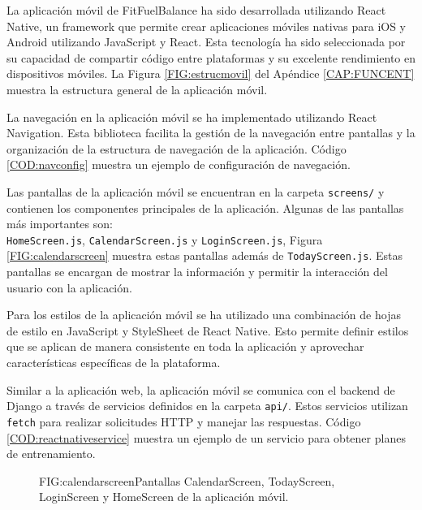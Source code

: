 La aplicación móvil  de FitFuelBalance ha sido desarrollada utilizando React Native, un framework que permite crear aplicaciones móviles nativas para iOS y Android utilizando JavaScript y React. Esta tecnología ha sido seleccionada por su capacidad de compartir código entre plataformas y su excelente rendimiento en dispositivos móviles. La Figura \ref{FIG:estrucmovil} del Apéndice \ref{CAP:FUNCENT} muestra la estructura general de la aplicación móvil.

La navegación  en la aplicación móvil se ha implementado utilizando React Navigation. Esta biblioteca facilita la gestión de la navegación entre pantallas y la organización de la estructura de navegación de la aplicación. Código \ref{COD:navconfig} muestra un ejemplo de configuración de navegación.

Las pantallas de la aplicación móvil se encuentran en la carpeta \texttt{screens/}  y contienen los componentes principales de la aplicación. Algunas de las pantallas más importantes son: \\\texttt{HomeScreen.js}, \texttt{CalendarScreen.js} y \texttt{LoginScreen.js}, Figura \ref{FIG:calendarscreen} muestra estas pantallas además de \texttt{TodayScreen.js}. Estas pantallas se encargan de mostrar la información y permitir la interacción del usuario con la aplicación.

Para los estilos  de la aplicación móvil se ha utilizado una combinación de hojas de estilo en JavaScript y StyleSheet de React Native. Esto permite definir estilos que se aplican de manera consistente en toda la aplicación y aprovechar características específicas de la plataforma.

Similar a la aplicación web, la aplicación móvil se comunica con el backend de Django a través de servicios definidos en la carpeta \texttt{api/}. Estos servicios utilizan \texttt{fetch}  para realizar solicitudes HTTP y manejar las respuestas. Código \ref{COD:reactnativeservice} muestra un ejemplo de un servicio para obtener planes de entrenamiento.

\begin{figure}[CalendarScreen, TodayScreen, LoginScreen y HomeScreen]{FIG:calendarscreen}{Pantallas CalendarScreen, TodayScreen, LoginScreen y HomeScreen de la aplicación móvil.}
\end{figure}

\newpage